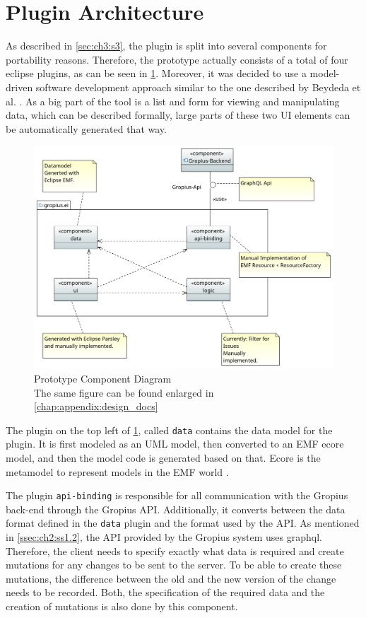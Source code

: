 \section{Plugin Architecture}
\label{sec:ch4:s3}
As described in \cref{sec:ch3:s3}, the plugin is split into several components for portability reasons.
Therefore, the prototype actually consists of a total of four eclipse plugins, as can be seen in \cref{fig:c4:component_diagram}.
Moreover, it was decided to use a model-driven software development approach similar to the one described by Beydeda et al. \cite{beydeda2005model}.
As a big part of the tool is a list and form for viewing and manipulating data, which can be described formally,
large parts of these two \gls{UI} elements can be automatically generated that way.

\begin{figure}[!h]
	\centering
	\includegraphics[width=\textwidth]{graphics/Component_Diagram.png}
	\caption{Prototype Component Diagram \\ \footnotesize{The same figure can be found enlarged in \cref{chap:appendix:design_docs}}}
	\label{fig:c4:component_diagram}
\end{figure}

The plugin on the top left of \cref{fig:c4:component_diagram}, called \lstinline|data| contains the data model for the plugin. 
It is first modeled as an \gls{UML} model, then converted to an \gls{EMF} ecore model, and then the model code is generated based on that.
Ecore is the metamodel to represent models in the \gls{EMF} world \cite{steinberg2008emf}.

The plugin \lstinline|api-binding| is responsible for all communication with the \gls{Gropius} back-end through the \gls{Gropius} \gls{API}.
Additionally, it converts between the data format defined in the \lstinline|data| plugin and the format used by the \gls{API}.
As mentioned in \cref{ssec:ch2:ss1.2}, the \gls{API} provided by the Gropius system uses \gls{graphql}.
Therefore, the client needs to specify exactly what data is required and create mutations for any changes to be sent to the server.
To be able to create these mutations, the difference between the old and the new version of the change needs to be recorded.
Both, the specification of the required data and the creation of mutations is also done by this component.

